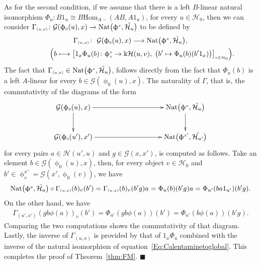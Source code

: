 \documentclass[pdftex]{sigma}
\numberwithin{equation}{section}
\renewcommand{\hom}[3]{\mathrm{Hom}_{\Sscript{#1}}\left(#2, #3\right)}
\newcommand{\Ho}{\cH_{\Sscript{0}}}
\newcommand{\cG}{{\mathcal G}}
\newcommand{\cH}{{\mathcal H}}
\newcommand{\Sscript}[1]{\scriptscriptstyle{#1}}
\newcommand{\phio}{\upphi_{\Sscript{0}}}
\newcommand*{\QEDA}{\hfill\ensuremath{\blacksquare}}%
\begin{document}
As for the second condition, if we assume that there is a left $B$-linear natural isomorphism $\Phi_{u}\colon B1_{u} \cong B\hom{A-}{AB}{A1_{u}}$, for every $u \in \Ho$, then we can consider $\Gamma_{\Sscript{(u, x)}}\colon \cG(\phio(u),x) \to {\rm Nat}\big(\upphi^{\Sscript{x}}, \tilde{\cH_{u}}\big)$ to be defined by
\begin{gather*}
\Gamma_{\Sscript{(u, x)}}\colon \ \cG(\phio(u), x) \longrightarrow {\rm Nat}\big(\upphi^{\Sscript{x}}, \tilde{\cH_{u}}\big), \\
\hphantom{\Gamma_{\Sscript{(u, x)}}\colon}{} \ \Big( b \longmapsto \big[ 1_{x}\Phi_{u}(b)\colon \upphi^{\Sscript{x}} _{\Sscript{v}} \to \Bbbk \cH(u,v), \;\big( b' \mapsto
\Phi_{u}(b)(b'1_{x})\big) \big]_{\Sscript{v \in \Ho} } \Big).
\end{gather*}
The fact that $\Gamma_{\Sscript{(u, x)}} \in {\rm Nat}\big(\upphi^{\Sscript{x}}, \tilde{\cH_{u}}\big)$, follows directly from the fact that $\Phi_{u}(b)$ is a left $A$-linear for every $b \in \cG(\phio(u),x)$. The naturality of $\Gamma$, that is, the commutativity of the diagrams of the form
\begin{gather*}
\xymatrix@C=45pt{ \cG(\phio(u), x) \ar@{->}[rr] \ar@{->}[d] & & {\rm Nat}\big(\upphi^{\Sscript{x}}, \tilde{\cH_{u}}\big) \ar@{->}[d] \\ \cG(\phio(u'), x') \ar@{->}[rr] & & {\rm Nat}\big(\upphi^{\Sscript{x'}},
\tilde{\cH_{u'}}\big) }
\end{gather*}
for every pairs $ a \in \cH(u',u)$ and $g\in \cG(x,x')$, is computed as follows. Take an element $b \in \cG(\phio(u), x)$, then, for every object $v \in \Ho$ and $ b' \in
\upphi^{\Sscript{x'}}_{\Sscript{v}}=\cG(x',\phio(v))$, we have
\begin{gather*}
{\rm Nat}\big(\upphi^{\Sscript{g}}, \tilde{\cH_{a}}\big) \circ \Gamma_{\Sscript{(u, x)}}(b)_{v}(b') = \Gamma_{\Sscript{(u, x)}}(b)_{v}(b'g) a = \Phi_{u}(b)(b'g) a = \Phi_{u'}(ba1_{u'})(b'g).
\end{gather*}
On the other hand, we have
\begin{gather*}
\Gamma_{\Sscript{(u', x')}}(gb\phi(a))_{v}(b') = \Phi_{u'}(gb\phi(a))(b') = \Phi_{u'}(b\phi(a))(b'g).
\end{gather*}
Comparing the two computations shows the commutativity of that diagram. Lastly, the inverse of $\Gamma_{\Sscript{(u, x)}}$ is provided by that of $1_{x}\Phi_{u}$ combined with the inverse of the natural isomorphism of equation~\eqref{Eq:Calentaminetoglobal}. This completes the proof of Theorem~\ref{thm:FM}.
\QEDA
\end{document}
